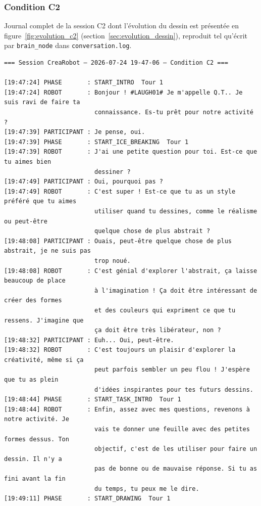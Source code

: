 \documentclass[11pt]{article}
\begin{document}
\subsubsection{Condition C2}
\label{annexe:log_c2}

Journal complet de la session C2 dont l'évolution du dessin est présentée en figure~\ref{fig:evolution_c2} (section~\ref{sec:evolution_dessin}), reproduit tel qu'écrit par \texttt{brain\_node} dans \texttt{conversation.log}.

{\small
\begin{verbatim}
=== Session CreaRobot — 2026-07-24 19-47-06 — Condition C2 ===

[19:47:24] PHASE       : START_INTRO  Tour 1
[19:47:24] ROBOT       : Bonjour ! #LAUGH01# Je m'appelle Q.T.. Je suis ravi de faire ta
                         connaissance. Es-tu prêt pour notre activité ?
[19:47:39] PARTICIPANT : Je pense, oui.
[19:47:39] PHASE       : START_ICE_BREAKING  Tour 1
[19:47:39] ROBOT       : J'ai une petite question pour toi. Est-ce que tu aimes bien
                         dessiner ?
[19:47:49] PARTICIPANT : Oui, pourquoi pas ?
[19:47:49] ROBOT       : C'est super ! Est-ce que tu as un style préféré que tu aimes
                         utiliser quand tu dessines, comme le réalisme ou peut-être
                         quelque chose de plus abstrait ?
[19:48:08] PARTICIPANT : Ouais, peut-être quelque chose de plus abstrait, je ne suis pas
                         trop noué.
[19:48:08] ROBOT       : C'est génial d'explorer l'abstrait, ça laisse beaucoup de place
                         à l'imagination ! Ça doit être intéressant de créer des formes
                         et des couleurs qui expriment ce que tu ressens. J'imagine que
                         ça doit être très libérateur, non ?
[19:48:32] PARTICIPANT : Euh... Oui, peut-être.
[19:48:32] ROBOT       : C'est toujours un plaisir d'explorer la créativité, même si ça
                         peut parfois sembler un peu flou ! J'espère que tu as plein
                         d'idées inspirantes pour tes futurs dessins.
[19:48:44] PHASE       : START_TASK_INTRO  Tour 1
[19:48:44] ROBOT       : Enfin, assez avec mes questions, revenons à notre activité. Je
                         vais te donner une feuille avec des petites formes dessus. Ton
                         objectif, c'est de les utiliser pour faire un dessin. Il n'y a
                         pas de bonne ou de mauvaise réponse. Si tu as fini avant la fin
                         du temps, tu peux me le dire.
[19:49:11] PHASE       : START_DRAWING  Tour 1

\end{verbatim}}
\end{document}
